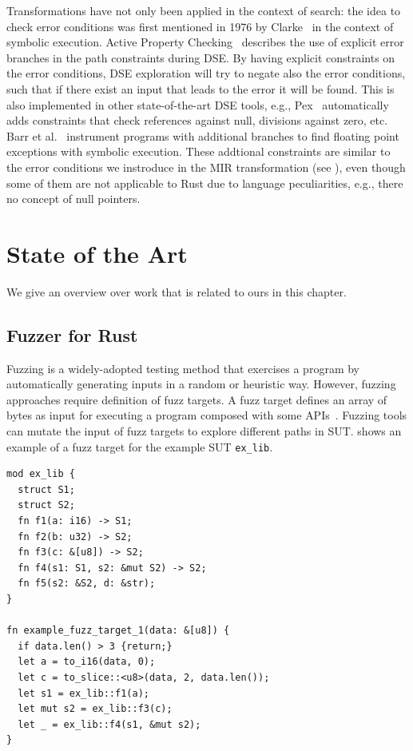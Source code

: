 \documentclass[paper=a4,%
  twoside,%
  BCOR4mm,%
  abstract=true,%
  toc=bibliography,%
  chapterprefix=true,%
  toc=bibliographynumbered,%
  open=right,%
  english,%
  pagesize=pdftex]{scrreprt}
\newcommand{\mir}{\ac{MIR}\xspace}
\begin{document}

Transformations have not only been applied in the context of search: the idea to check error conditions was first mentioned in 1976 by Clarke~\cite{Clarke1976} in the context of symbolic execution. Active Property Checking~\cite{Godefroid_2005} describes the use of explicit error branches in the path constraints during \ac{DSE}. By having explicit constraints on the error conditions, \ac{DSE} exploration will try to negate also the error conditions, such that if there exist an input that leads to the error it will be found. This is also implemented in other state-of-the-art \ac{DSE} tools, e.g., Pex~\cite{Tillmann2008} automatically adds constraints that check references against null, divisions against zero, etc. Barr et al.~\cite{Barr2013} instrument programs with additional branches to find floating point exceptions with symbolic execution. These addtional constraints are similar to the error conditions we instroduce in the \mir transformation (see ), even though some of them are not applicable to Rust due to language peculiarities, e.g., there no concept of null pointers.

\clearpage
\chapter{State of the Art}
\label{chap:state-of-the-art}
We give an overview over work that is related to ours in this chapter. 

\section{Fuzzer for Rust}
Fuzzing is a widely-adopted testing method that exercises a program by automatically generating inputs in a random or heuristic way. However, fuzzing approaches require definition of fuzz targets. A fuzz target defines an array of bytes as input for executing a program composed with some \acp{API}~\cite{Jiang2021}. Fuzzing tools can mutate the input of fuzz targets to explore different paths in \ac{SUT}.  shows an example of a fuzz target for the example \ac{SUT} \texttt{ex\_lib}.

\begin{lstlisting}[style=boxed, caption={A sample problem for fuzz target generation~\cite{Jiang2021}}, label=lst:fuzz-target-example]
mod ex_lib {
  struct S1;
  struct S2;
  fn f1(a: i16) -> S1;
  fn f2(b: u32) -> S2;
  fn f3(c: &[u8]) -> S2;
  fn f4(s1: S1, s2: &mut S2) -> S2;
  fn f5(s2: &S2, d: &str);
}

fn example_fuzz_target_1(data: &[u8]) {
  if data.len() > 3 {return;}
  let a = to_i16(data, 0);
  let c = to_slice::<u8>(data, 2, data.len());
  let s1 = ex_lib::f1(a);
  let mut s2 = ex_lib::f3(c);
  let _ = ex_lib::f4(s1, &mut s2);
}
\end{lstlisting}
\end{document}
